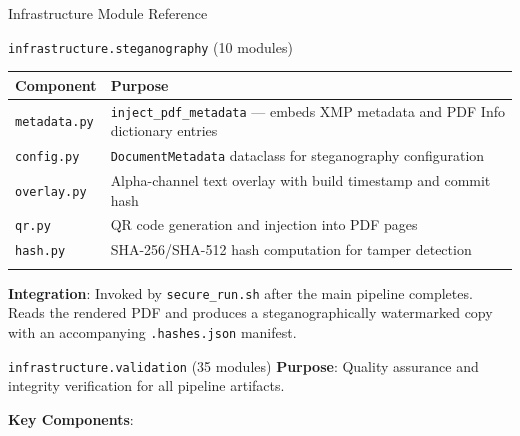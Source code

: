 \documentclass[
  ignorenonframetext,
]{beamer}
\newcounter{none} %
\begin{document}
\begin{frame}[fragile]{Infrastructure Module Reference}
\begin{block}{\texttt{infrastructure.steganography} (10 modules)}
{\def\LTcaptype{none} %
\begin{longtable}[]{@{}
  >{\raggedright\arraybackslash}p{}
  >{\raggedright\arraybackslash}p{}@{}}
\toprule\noalign{}
\begin{minipage}[b]{\linewidth}\raggedright
Component
\end{minipage} & \begin{minipage}[b]{\linewidth}\raggedright
Purpose
\end{minipage} \\
\midrule\noalign{}
\endhead
\texttt{metadata.py} & \texttt{inject\_pdf\_metadata} --- embeds XMP
metadata and PDF Info dictionary entries \\
\texttt{config.py} & \texttt{DocumentMetadata} dataclass for
steganography configuration \\
\texttt{overlay.py} & Alpha-channel text overlay with build timestamp
and commit hash \\
\texttt{qr.py} & QR code generation and injection into PDF pages \\
\texttt{hash.py} & SHA-256/SHA-512 hash computation for tamper
detection \\
\bottomrule\noalign{}
\end{longtable}
}

\textbf{Integration}: Invoked by \texttt{secure\_run.sh} after the main
pipeline completes. Reads the rendered PDF and produces a
steganographically watermarked copy with an accompanying
\texttt{.hashes.json} manifest.
\end{block}

\begin{block}{\texttt{infrastructure.validation} (35 modules)}
\protect{}\label{infrastructure.validation-35-modules}
\textbf{Purpose}: Quality assurance and integrity verification for all
pipeline artifacts.

\textbf{Key Components}:


\end{block}
\end{frame}
\end{document}
